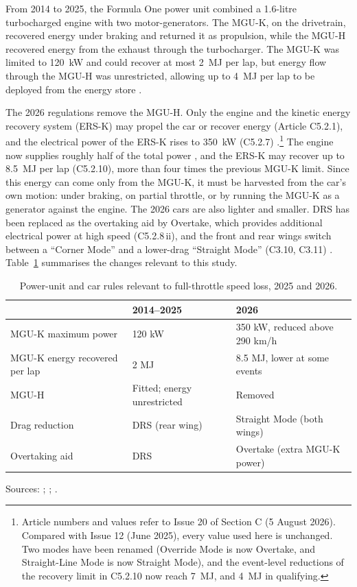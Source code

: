 \documentclass[11pt,a4paper]{article}
\begin{document}
From 2014 to 2025, the Formula One power unit combined a 1.6-litre turbocharged engine with two motor-generators. The MGU-K, on the drivetrain, recovered energy under braking and returned it as propulsion, while the MGU-H recovered energy from the exhaust through the turbocharger. The MGU-K was limited to 120~kW and could recover at most 2~MJ per lap, but energy flow through the MGU-H was unrestricted, allowing up to 4~MJ per lap to be deployed from the energy store \citep{bopaiah2020strategy, bopaiah2021, limebeer2014ers}.

The 2026 regulations remove the MGU-H. Only the engine and the kinetic energy recovery system (ERS-K) may propel the car or recover energy (Article C5.2.1), and the electrical power of the ERS-K rises to 350~kW (C5.2.7) \citep{fia2026c}.\footnote{Article numbers and values refer to Issue 20 of Section C (5 August 2026). Compared with Issue 12 (June 2025), every value used here is unchanged. Two modes have been renamed (Override Mode is now Overtake, and Straight-Line Mode is now Straight Mode), and the event-level reductions of the recovery limit in C5.2.10 now reach 7~MJ, and 4~MJ in qualifying.} The engine now supplies roughly half of the total power \citep{medland2026rules}, and the ERS-K may recover up to 8.5~MJ per lap (C5.2.10), more than four times the previous MGU-K limit. Since this energy can come only from the MGU-K, it must be harvested from the car's own motion: under braking, on partial throttle, or by running the MGU-K as a generator against the engine. The 2026 cars are also lighter and smaller. DRS has been replaced as the overtaking aid by Overtake, which provides additional electrical power at high speed (C5.2.8\,ii), and the front and rear wings switch between a ``Corner Mode'' and a lower-drag ``Straight Mode'' (C3.10, C3.11) \citep{fia2026c, medland2026rules}. Table~\ref{tab:rules} summarises the changes relevant to this study.

\begin{table}[!htbp]
  \centering
  \caption{Power-unit and car rules relevant to full-throttle speed loss, 2025 and 2026.}
  \label{tab:rules}
  \small
  \begin{tabular}{lll}
    \toprule
     & 2014--2025 & 2026 \\
    \midrule
    MGU-K maximum power & 120 kW & 350 kW, reduced above 290 km/h \\
    MGU-K energy recovered per lap & 2 MJ & 8.5 MJ, lower at some events \\
    MGU-H & Fitted; energy unrestricted & Removed \\
    Drag reduction & DRS (rear wing) & Straight Mode (both wings) \\
    Overtaking aid & DRS & Overtake (extra MGU-K power) \\
    \bottomrule
  \end{tabular}

  \smallskip
  {\footnotesize Sources: \citet{bopaiah2020strategy, bopaiah2021}; \citet{fia2026c}; \citet{medland2026rules}.}
\end{table}
\end{document}
